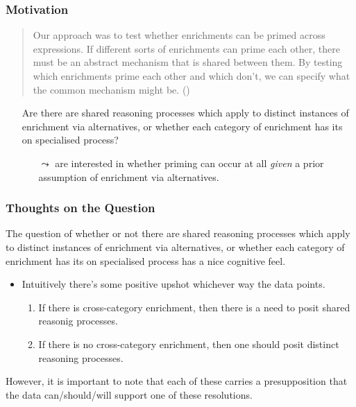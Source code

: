 \documentclass[noamssymb]{beamer}
\newcommand{\hand}{\ding{43}}
\begin{document}
\begin{frame}
  \maketitle
\end{frame}


\begin{frame}
  \frametitle{{\ftf Motivation}}

  \begin{quote}
    Our approach was to test whether enrichments can be primed across expressions.
    If different sorts of enrichments can prime each other, there must be an abstract mechanism that is shared between them.
    By testing which enrichments prime each other and which don’t, we can specify what the common mechanism might be.\nolinebreak
    \hfill(\citeyear[118]{Bott:2016aa})
\end{quote}

\begin{itemize}
\item[\hand] Are there are shared reasoning processes which apply to distinct instances of enrichment via alternatives, or whether each category of enrichment has its on specialised process?
  \begin{itemize}
  \item[\(\leadsto\)] \citeauthor{Bott:2016aa} are interested in whether priming can occur at all \emph{given} a prior assumption of enrichment via alternatives.
  \end{itemize}
\end{itemize}
\end{frame}

\begin{frame}
  \frametitle{{\ftf Thoughts on the Question}}
 The question of whether or not there are shared reasoning processes which apply to distinct instances of enrichment via alternatives, or whether each category of enrichment has its on specialised process has a nice cognitive feel.

 \begin{itemize}
  \item Intuitively there's some positive upshot whichever way the data points.
    \begin{enumerate}[label=(\roman*)]
    \item If there is cross-category enrichment, then there is a need to posit shared reasonig processes.
    \item If there is no cross-category enrichment, then one should posit distinct reasoning processes.
    \end{enumerate}
    \end{itemize}
  However, it is important to note that each of these carries a presupposition that the data can/should/will support one of these resolutions.

\end{frame}
\end{document}
